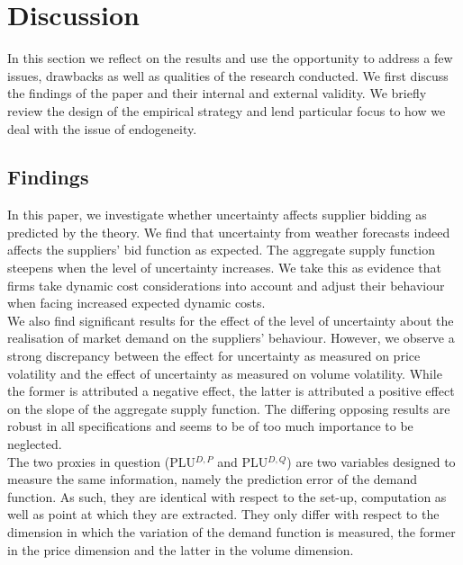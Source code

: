 \section{Discussion }
\label{discussgeneral}
\pagestyle{plain}
In this section we reflect on the results and use the opportunity to address a few issues, drawbacks as well as qualities of the research conducted. We first discuss the findings of the paper and their internal and external validity. We briefly review the design of the empirical strategy and lend particular focus to how we deal with the issue of endogeneity.

\subsection{Findings}
In this paper, we investigate whether uncertainty affects supplier bidding as predicted by the theory. 
We find that uncertainty from weather forecasts indeed affects the suppliers' bid function as expected. The aggregate supply function steepens when the level of uncertainty increases. We take this as evidence that firms take dynamic cost considerations into account and adjust their behaviour when facing increased expected dynamic costs. \\

We also find significant results for the effect of the level of uncertainty about the realisation of market demand on the suppliers' behaviour. However, we observe a strong discrepancy between the effect for uncertainty as measured on price volatility and the effect of uncertainty as measured on volume volatility. While the former is attributed a negative effect, the latter is attributed a positive effect on the slope of the aggregate supply function. 
The differing opposing results are robust in all specifications and seems to be of too much importance to be neglected. \\

The two proxies in question (PLU$^{D,P}$ and PLU$^{D,Q}$) are two variables designed to measure the same information, namely the prediction error of the demand function.
As such, they are identical with respect to the set-up, computation as well as point at which they are extracted. They only differ with respect to the dimension in which the variation of the demand function  is measured, the former in the price dimension and the latter in the volume dimension. \\

